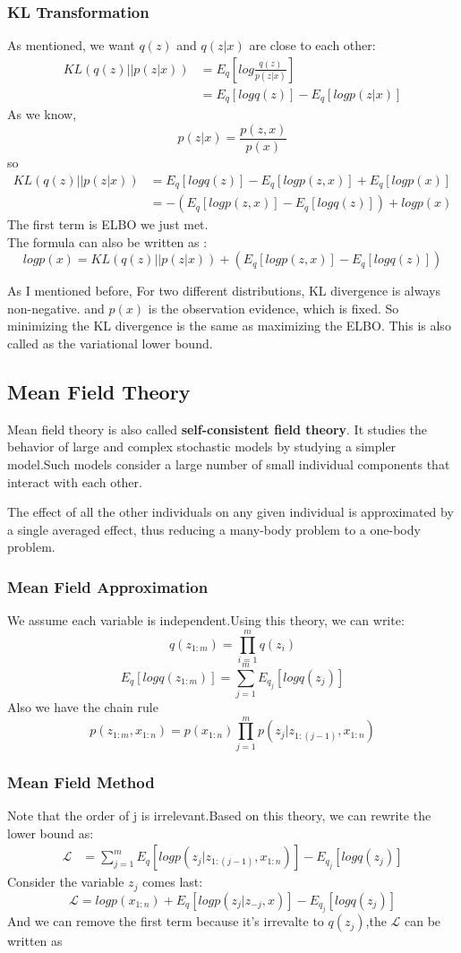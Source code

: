 \documentclass{article}
\begin{document}
\subsubsection{KL Transformation}
As mentioned, we want $q(z)$ and $q(z|x)$ are close to each other:
\begin{align*}
KL(q(z)||p(z|x)) &= E_{q}\left[ log \frac{q(z)}{p(z|x)} \right] \\
&=E_{q}[logq(z)]-E_{q}[logp(z|x)]
\end{align*}
As we know,
$$p(z|x)=\frac{p(z,x)}{p(x)}$$
so 
\begin{align*}
KL(q(z)||p(z|x)) &= E_{q}[logq(z)]-E_{q}[logp(z,x)]+E_{q}[logp(x)] \\
&= -(E_{q}[logp(z,x)]-E_{q}[logq(z)])+logp(x)
\end{align*}
The first term is ELBO we just met.\\
The formula can also be written as :
$$logp(x)=KL(q(z)||p(z|x))+(E_{q}[logp(z,x)]-E_{q}[logq(z)])$$

As I mentioned before, For two different distributions, KL divergence is always non-negative. and $p(x)$ is the observation evidence, which is fixed. So minimizing the KL divergence is the same as maximizing the ELBO. This is also called as the variational lower bound.

\subsection{Mean Field Theory}
Mean field theory is also called \textbf{self-consistent field theory}. It studies the behavior of large and complex stochastic models by studying a simpler model.Such models consider a large number of small individual components that interact with each other.

The effect of all the other individuals on any given individual is approximated by a single averaged effect, thus reducing a many-body problem to a one-body problem.
\subsubsection{Mean Field Approximation}
We assume each variable is independent.Using this theory, we can write:
$$q(z_{1:m})= \prod _{i=1}^{m}q(z_{i})$$
$$E_{q}[logq(z_{1:m})]=\sum_{j=1}^{m}E_{q_{j}}[logq(z_{j})]$$
Also we have the chain rule 
$$p(z_{1:m},x_{1:n})=p(x_{1:n}) \prod_{j=1}^{m}p(z_{j}|z_{1:(j-1)},x_{1:n})$$
\subsubsection{Mean Field Method}
Note that the order of j is irrelevant.Based on this theory, we can rewrite the lower bound as:
\begin{align*}
\mathcal{L} &= \sum_{j=1}^{m} E_{q}[logp(z_{j}|z_{1:(j-1)},x_{1:n})]-E_{q_{j}}[logq(z_{j})] 
\end{align*}
Consider the variable $z_{j}$ comes last: 
$$\mathcal{L} =logp(x_{1:n})+E_{q}[logp(z_{j}|z_{-j},x)]-E_{q_{j}}[logq(z_{j})]$$
And we can remove the first term because it's irrevalte to $q(z_{j})$,the $\mathcal{L}$ can be written as
\end{document}
